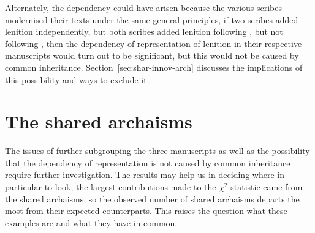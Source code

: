 Alternately, the dependency could have arisen because the various scribes modernised their texts under the same general principles, \eg if two scribes added lenition independently, but both scribes added lenition following , but not following , then the dependency of representation of lenition in their respective manuscripts would turn out to be significant, but this would not be caused by common inheritance. Section~\ref{sec:shar-innov-arch} discusses the implications of this possibility and ways to exclude it. 

\section{The shared archaisms}
\label{sec:beyond-stat-again}

The issues  of further subgrouping the three manuscripts as well as the  possibility that the dependency of representation is not caused by common inheritance require further investigation. The results may help us in deciding where in particular to look; the largest contributions made to the \(\chi^2\)-statistic came from the shared archaisms, so the observed number of shared archaisms departs the most from their expected counterparts. This raises the question what these examples are and what they have in common. 



